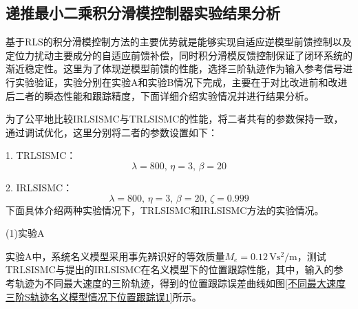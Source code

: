 \subsection{递推最小二乘积分滑模控制器实验结果分析}
基于RLS的积分滑模控制方法的主要优势就是能够实现自适应逆模型前馈控制以及定位力扰动主要成分的自适应前馈补偿，同时积分滑模反馈控制保证了闭环系统的渐近稳定性。这里为了体现逆模型前馈的性能，选择三阶轨迹作为输入参考信号进行实验验证，实验分别在实验A和实验B情况下完成，主要在于对比改进前和改进后二者的瞬态性能和跟踪精度，下面详细介绍实验情况并进行结果分析。


为了公平地比较IRLSISMC与TRLSISMC的性能，将二者共有的参数保持一致，通过调试优化，这里分别将二者的参数设置如下：

1. TRLSISMC：
\begin{equation}
\lambda=800,\,\eta=3,\,\beta=20
\end{equation}



2. IRLSISMC：
\begin{equation}
\lambda=800,\,\eta=3,\,\beta=20,\,\zeta=0.999
\end{equation}
下面具体介绍两种实验情况下，TRLSISMC和IRLSISMC方法的实验情况。

(1)实验A

实验A中，系统名义模型采用事先辨识好的等效质量$M_e=\text{0.12$\,$Vs$^{2}$/m}$，测试TRLSISMC与提出的IRLSISMC在名义模型下的位置跟踪性能，其中，输入的参考轨迹为不同最大速度的三阶轨迹，得到的位置跟踪误差曲线如图\ref{不同最大速度三阶S轨迹名义模型情况下位置跟踪误1}所示。



